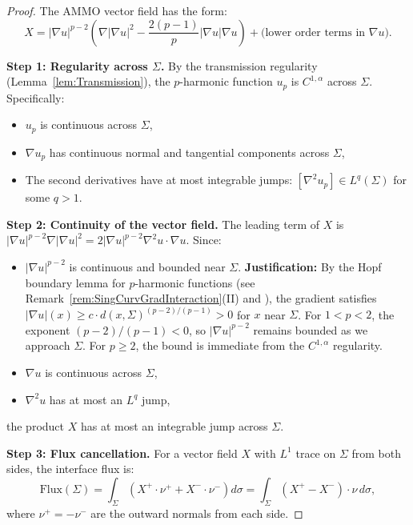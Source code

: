 \begin{proof}
The AMMO vector field has the form:
\begin{equation}
    X = |\nabla u|^{p-2} \left( \nabla|\nabla u|^2 - \frac{2(p-1)}{p} |\nabla u| \nabla u \right) + \text{(lower order terms in } \nabla u).
\end{equation}

\textbf{Step 1: Regularity across $\Sigma$.}
By the transmission regularity (Lemma~\ref{lem:Transmission}), the $p$-harmonic function $u_p$ is $C^{1,\alpha}$ across $\Sigma$. Specifically:
\begin{itemize}
    \item $u_p$ is continuous across $\Sigma$,
    \item $\nabla u_p$ has continuous normal and tangential components across $\Sigma$,
    \item The second derivatives have at most integrable jumps: $[\nabla^2 u_p] \in L^q(\Sigma)$ for some $q > 1$.
\end{itemize}

\textbf{Step 2: Continuity of the vector field.}
The leading term of $X$ is $|\nabla u|^{p-2} \nabla|\nabla u|^2 = 2|\nabla u|^{p-2} \nabla^2 u \cdot \nabla u$. Since:
\begin{itemize}
    \item $|\nabla u|^{p-2}$ is continuous and bounded near $\Sigma$. \textbf{Justification:} By the Hopf boundary lemma for $p$-harmonic functions (see Remark~\ref{rem:SingCurvGradInteraction}(II) and \cite{tolksdorf1984, lieberman1988}), the gradient satisfies $|\nabla u|(x) \ge c \cdot d(x, \Sigma)^{(p-2)/(p-1)} > 0$ for $x$ near $\Sigma$. For $1 < p < 2$, the exponent $(p-2)/(p-1) < 0$, so $|\nabla u|^{p-2}$ remains bounded as we approach $\Sigma$. For $p \ge 2$, the bound is immediate from the $C^{1,\alpha}$ regularity.
    \item $\nabla u$ is continuous across $\Sigma$,
    \item $\nabla^2 u$ has at most an $L^q$ jump,
\end{itemize}
the product $X$ has at most an integrable jump across $\Sigma$.

\textbf{Step 3: Flux cancellation.}
For a vector field $X$ with $L^1$ trace on $\Sigma$ from both sides, the interface flux is:
\begin{equation}
    \text{Flux}(\Sigma) = \int_\Sigma \left( X^+ \cdot \nu^+ + X^- \cdot \nu^- \right) d\sigma = \int_\Sigma \left( X^+ - X^- \right) \cdot \nu \, d\sigma,
\end{equation}
where $\nu^+ = -\nu^-$ are the outward normals from each side.


\end{proof}
